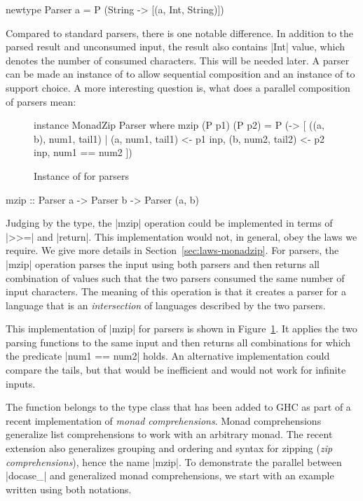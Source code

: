 \documentclass{sigplanconf}
\begin{document}
\begin{code}
newtype Parser a = P (String -> [(a, Int, String)])
\end{code}
Compared to standard parsers, there is one notable difference. In addition to the parsed result
and unconsumed input, the result also contains |Int| value, which denotes the number of consumed
characters. This will be needed later. A parser can be made an instance of  to allow 
sequential composition and an instance of  to support choice. A more interesting 
question is, what does a parallel composition of parsers mean:

\begin{figure}
\begin{code}
instance MonadZip Parser where 
  mzip (P p1) (P p2) = P (\inp ->
    [ ((a, b), num1, tail1) |
         (a, num1, tail1) <- p1 inp,
         (b, num2, tail2) <- p2 inp, num1 == num2 ])
\end{code}
\caption{Instance of  for parsers}
\label{fig:parser-monadzip}
\end{figure}

\begin{code}
mzip :: Parser a -> Parser b -> Parser (a, b)
\end{code}
Judging by the type, the |mzip| operation could be implemented in terms of |>>=| and |return|. 
This implementation would not, in general, obey the laws we require. We give more details in 
Section~\ref{sec:laws-monadzip}. For parsers, the |mzip| operation parses the input using both parsers and then 
returns all combination of values such that the two parsers consumed the same number of input 
characters. The meaning of this operation is that it creates a parser for a language that is an 
\textit{intersection} of languages described by the two parsers.

This implementation of |mzip| for parsers is shown in Figure~\ref{fig:parser-monadzip}. It
applies the two parsing functions to the same input and then returns all combinations for which
the predicate |num1 == num2| holds. An alternative implementation could compare the tails, but
that would be inefficient and would not work for infinite inputs.

The function belongs to the  type class that has been added to GHC as part of a recent
implementation of \textit{monad comprehensions}. Monad comprehensions \cite{comprehendingmonads} 
generalize list comprehensions to work with an arbitrary monad. The recent extension
\cite{bringbackmc, comprefun} also generalizes grouping and ordering \cite{groupordercompre} and
syntax for zipping (\textit{zip comprehensions}), hence the name |mzip|. To demonstrate the 
parallel between |docase_| and generalized monad comprehensions, we start with an example written 
using both notations.
\end{document}
